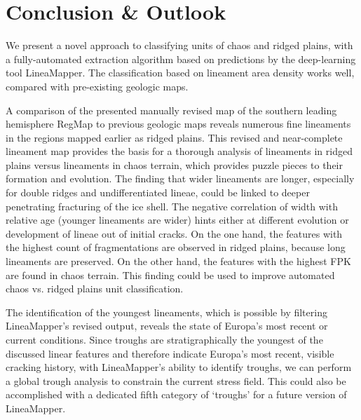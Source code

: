 \section{Conclusion \& Outlook}\label{sec:regio_conclusion}
We present a novel approach to classifying units of chaos and ridged plains, with a fully-automated extraction algorithm based on predictions by the deep-learning tool LineaMapper. The classification based on lineament area density works well, compared with pre-existing geologic maps.

A comparison of the presented manually revised map of the southern leading hemisphere RegMap to previous geologic maps reveals numerous fine lineaments in the regions mapped earlier as ridged plains. This revised and near-complete lineament map provides the basis for a thorough analysis of lineaments in ridged plains versus lineaments in chaos terrain, which provides puzzle pieces to their formation and evolution. The finding that wider lineaments are longer, especially for double ridges and undifferentiated lineae, could be linked to deeper penetrating fracturing of the ice shell. The negative correlation of width with relative age (younger lineaments are wider) hints either at different evolution or development of lineae out of initial cracks.  
On the one hand, the features with the highest count of fragmentations are observed in ridged plains, because long lineaments are preserved. On the other hand, the features with the highest FPK are found in chaos terrain. This finding could be used to improve automated chaos vs. ridged plains unit classification. 


The identification of the youngest lineaments, which is possible by filtering LineaMapper's revised output, reveals the state of Europa’s most recent or current conditions. Since troughs are stratigraphically the youngest of the discussed linear features and therefore indicate Europa's most recent, visible cracking history, with LineaMapper's ability to identify troughs, we can perform a global trough analysis to constrain the current stress field. This could also be accomplished with a dedicated fifth category of `troughs' for a future version of LineaMapper.


